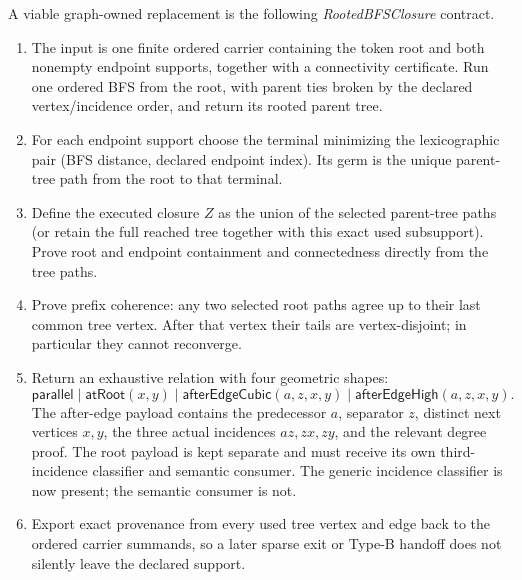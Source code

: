 \documentclass[11pt]{article}
\begin{document}
A viable graph-owned replacement is the following
\emph{RootedBFSClosure} contract.
\begin{enumerate}
\item The input is one finite ordered carrier containing the token root and
both nonempty endpoint supports, together with a connectivity certificate.
Run one ordered BFS from the root, with parent ties broken by the declared
vertex/incidence order, and return its rooted parent tree.
\item For each endpoint support choose the terminal minimizing the
lexicographic pair (BFS distance, declared endpoint index).  Its germ is the
unique parent-tree path from the root to that terminal.
\item Define the executed closure $Z$ as the union of the selected parent-tree
paths (or retain the full reached tree together with this exact used
subsupport).  Prove root and endpoint containment and connectedness directly
from the tree paths.
\item Prove prefix coherence: any two selected root paths agree up to their
last common tree vertex.  After that vertex their tails are vertex-disjoint;
in particular they cannot reconverge.
\item Return an exhaustive relation with four geometric shapes:
\[
 \mathsf{parallel}
 \mid \mathsf{atRoot}(x,y)
 \mid \mathsf{afterEdgeCubic}(a,z,x,y)
 \mid \mathsf{afterEdgeHigh}(a,z,x,y).
\]
The after-edge payload contains the predecessor $a$, separator $z$, distinct
next vertices $x,y$, the three actual incidences $az,zx,zy$, and the relevant
degree proof.  The root payload is kept separate and must receive its own
third-incidence classifier and semantic consumer.  The generic incidence
classifier is now present; the semantic consumer is not.
\item Export exact provenance from every used tree vertex and edge back to the
ordered carrier summands, so a later sparse exit or Type-B handoff does not
silently leave the declared support.
\end{enumerate}
\end{document}
